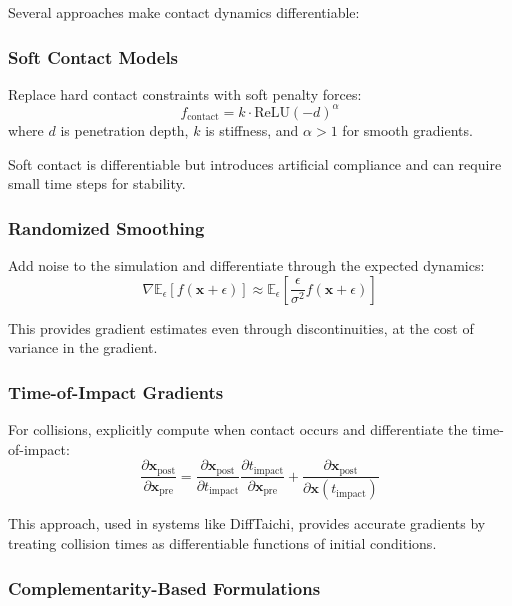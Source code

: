 Several approaches make contact dynamics differentiable:

\subsubsection{Soft Contact Models}

Replace hard contact constraints with soft penalty forces:
\begin{equation}
f_{\text{contact}} = k \cdot \text{ReLU}(-d)^\alpha
\end{equation}
where $d$ is penetration depth, $k$ is stiffness, and $\alpha > 1$ for smooth gradients.

Soft contact is differentiable but introduces artificial compliance and can require small time steps for stability.

\subsubsection{Randomized Smoothing}

Add noise to the simulation and differentiate through the expected dynamics:
\begin{equation}
\nabla \mathbb{E}_{\epsilon}[f(\mathbf{x} + \epsilon)] \approx \mathbb{E}_{\epsilon}\left[ \frac{\epsilon}{\sigma^2} f(\mathbf{x} + \epsilon) \right]
\end{equation}

This provides gradient estimates even through discontinuities, at the cost of variance in the gradient.

\subsubsection{Time-of-Impact Gradients}

For collisions, explicitly compute when contact occurs and differentiate the time-of-impact:
\begin{equation}
\frac{\partial \mathbf{x}_{\text{post}}}{\partial \mathbf{x}_{\text{pre}}} = \frac{\partial \mathbf{x}_{\text{post}}}{\partial t_{\text{impact}}} \frac{\partial t_{\text{impact}}}{\partial \mathbf{x}_{\text{pre}}} + \frac{\partial \mathbf{x}_{\text{post}}}{\partial \mathbf{x}(t_{\text{impact}})}
\end{equation}

This approach, used in systems like DiffTaichi, provides accurate gradients by treating collision times as differentiable functions of initial conditions.

\subsubsection{Complementarity-Based Formulations}

